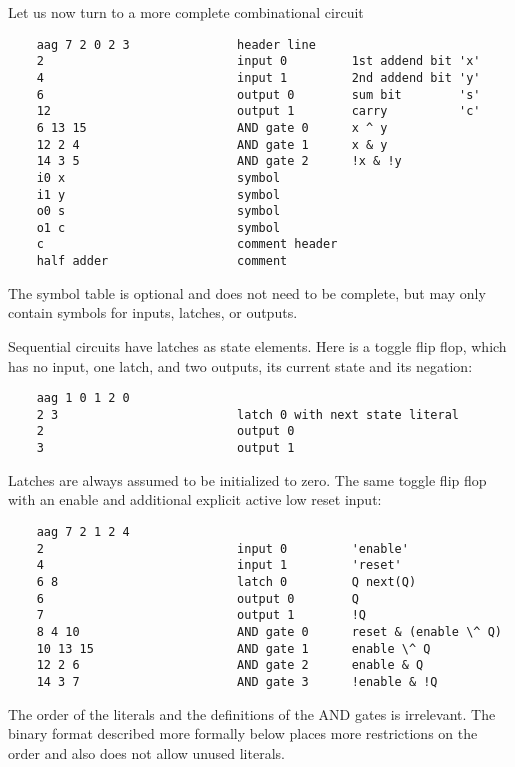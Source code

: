 \documentclass{llncs}
\begin{document}
  Let us now turn to a more complete combinational circuit

\begin{verbatim}
    aag 7 2 0 2 3               header line
    2                           input 0         1st addend bit 'x'
    4                           input 1         2nd addend bit 'y'
    6                           output 0        sum bit        's'
    12                          output 1        carry          'c'
    6 13 15                     AND gate 0      x ^ y
    12 2 4                      AND gate 1      x & y
    14 3 5                      AND gate 2      !x & !y
    i0 x                        symbol
    i1 y                        symbol
    o0 s                        symbol
    o1 c                        symbol
    c                           comment header
    half adder                  comment
\end{verbatim}

  The symbol table is optional and does not need to be complete, but may
  only contain symbols for inputs, latches, or outputs.

  Sequential circuits have latches as state elements. Here is a toggle flip
  flop, which has no input, one latch, and two outputs, its current state and
  its negation:

\begin{verbatim}
    aag 1 0 1 2 0
    2 3                         latch 0 with next state literal
    2                           output 0
    3                           output 1
\end{verbatim}

  Latches are always assumed to be initialized to zero.  The same toggle
  flip flop with an enable and additional explicit active low reset input:

\begin{verbatim}
    aag 7 2 1 2 4
    2                           input 0         'enable'
    4                           input 1         'reset'
    6 8                         latch 0         Q next(Q)
    6                           output 0        Q
    7                           output 1        !Q
    8 4 10                      AND gate 0      reset & (enable \^ Q)
    10 13 15                    AND gate 1      enable \^ Q
    12 2 6                      AND gate 2      enable & Q
    14 3 7                      AND gate 3      !enable & !Q
\end{verbatim}

  The order of the literals and the definitions of the AND gates
  is irrelevant.  The binary format described more formally below places
  more restrictions on the order and also does not allow unused literals.
\end{document}

